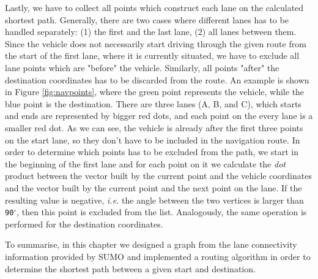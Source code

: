 Lastly, we have to collect all points which construct each lane on the calculated shortest path. Generally, there are two cases where different lanes has to be handled separately: (1) the first and the last lane, (2) all lanes between them. Since the vehicle does not necessarily start driving through the given route from the start of the first lane, where it is currently situated, we have to exclude all lane points which are "before" the vehicle. Similarly, all points "after" the destination coordinates has to be discarded from the route. An example is shown in Figure \ref{fig:navpoints}, where the green point represents the vehicle, while the blue point is the destination. There are three lanes (A, B, and C), which starts and ends are represented by bigger red dots, and each point on the every lane is a smaller red dot. As we can see, the vehicle is already after the first three points on the start lane, so they don't have to be included in the navigation route. In order to determine which points has to be excluded from the path, we start in the beginning of the first lane and for each point on it we calculate the \emph{dot} product between the vector built by the current point and the vehicle coordinates and the vector built by the current point and the next point on the lane. If the resulting value is negative, \emph{i.e.} the angle between the two vertices is larger than \texttt{90$^{\circ}$}, then this point is excluded from the list. Analogously, the same operation is performed for the destination coordinates.

To summarise, in this chapter we designed a graph from the lane connectivity information provided by SUMO and implemented a routing algorithm in order to determine the shortest path between a given start and destination. 
